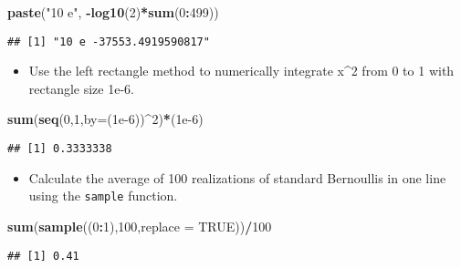 \documentclass[]{article}
\newenvironment{Shaded}{\begin{snugshade}}{\end{snugshade}}
\newcommand{\KeywordTok}[1]{\textcolor[rgb]{0.13,0.29,0.53}{\textbf{#1}}}
\newcommand{\DataTypeTok}[1]{\textcolor[rgb]{0.13,0.29,0.53}{#1}}
\newcommand{\DecValTok}[1]{\textcolor[rgb]{0.00,0.00,0.81}{#1}}
\newcommand{\FloatTok}[1]{\textcolor[rgb]{0.00,0.00,0.81}{#1}}
\newcommand{\StringTok}[1]{\textcolor[rgb]{0.31,0.60,0.02}{#1}}
\newcommand{\OtherTok}[1]{\textcolor[rgb]{0.56,0.35,0.01}{#1}}
\newcommand{\OperatorTok}[1]{\textcolor[rgb]{0.81,0.36,0.00}{\textbf{#1}}}
\newcommand{\NormalTok}[1]{#1}
\providecommand{\tightlist}{%
  \setlength{\itemsep}{0pt}\setlength{\parskip}{0pt}}
\begin{document}
\begin{Shaded}
\begin{Highlighting}[]
\KeywordTok{paste}\NormalTok{(}\StringTok{"10 e"}\NormalTok{, }\OperatorTok{-}\KeywordTok{log10}\NormalTok{(}\DecValTok{2}\NormalTok{)}\OperatorTok{*}\KeywordTok{sum}\NormalTok{(}\DecValTok{0}\OperatorTok{:}\DecValTok{499}\NormalTok{))}
\end{Highlighting}
\end{Shaded}

\begin{verbatim}
## [1] "10 e -37553.4919590817"
\end{verbatim}

\begin{itemize}
\tightlist
\item
  Use the left rectangle method to numerically integrate x\^{}2 from 0
  to 1 with rectangle size 1e-6.
\end{itemize}

\begin{Shaded}
\begin{Highlighting}[]
\KeywordTok{sum}\NormalTok{(}\KeywordTok{seq}\NormalTok{(}\DecValTok{0}\NormalTok{,}\DecValTok{1}\NormalTok{,}\DataTypeTok{by=}\NormalTok{(}\FloatTok{1e-6}\NormalTok{))}\OperatorTok{^}\DecValTok{2}\NormalTok{)}\OperatorTok{*}\NormalTok{(}\FloatTok{1e-6}\NormalTok{)}
\end{Highlighting}
\end{Shaded}

\begin{verbatim}
## [1] 0.3333338
\end{verbatim}

\begin{itemize}
\tightlist
\item
  Calculate the average of 100 realizations of standard Bernoullis in
  one line using the \texttt{sample} function.
\end{itemize}

\begin{Shaded}
\begin{Highlighting}[]
\KeywordTok{sum}\NormalTok{(}\KeywordTok{sample}\NormalTok{((}\DecValTok{0}\OperatorTok{:}\DecValTok{1}\NormalTok{),}\DecValTok{100}\NormalTok{,}\DataTypeTok{replace =} \OtherTok{TRUE}\NormalTok{))}\OperatorTok{/}\DecValTok{100}
\end{Highlighting}
\end{Shaded}

\begin{verbatim}
## [1] 0.41
\end{verbatim}
\end{document}
